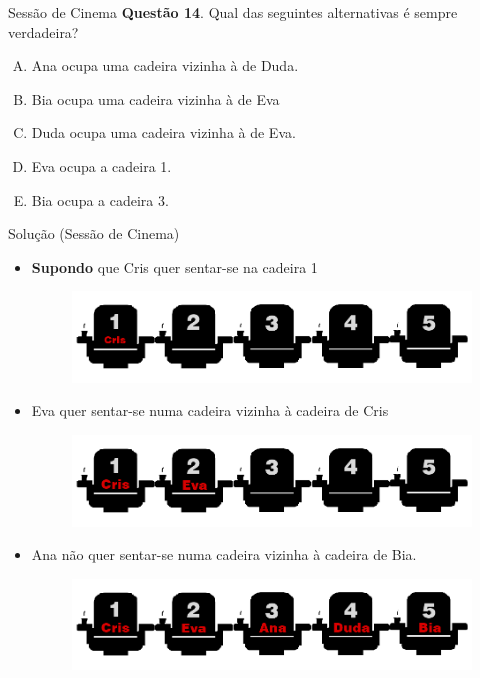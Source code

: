 \documentclass{beamer}
\begin{document}

\begin{frame}{Sessão de Cinema}
\textbf{Questão 14}. Qual das seguintes alternativas é
sempre verdadeira?
\begin{enumerate}[(A)]
    \item Ana ocupa uma cadeira vizinha à de Duda.
    \item Bia ocupa uma cadeira vizinha à de Eva
    \item Duda ocupa uma cadeira vizinha à de Eva.
    \item Eva ocupa a cadeira 1.
    \item Bia ocupa a cadeira 3.
\end{enumerate}
\end{frame}

\begin{frame}{Solução (Sessão de Cinema)}
\begin{itemize}
    \item \textbf{Supondo} que Cris quer sentar-se na cadeira 1
        \begin{figure}[ht]
        \centering
        \includegraphics[width=.8\textwidth]{nomes1.png}
        \label{fig:exampleFig2}
        \end{figure}
        \pause
        
    \item Eva quer sentar-se numa cadeira vizinha à cadeira de Cris
       \pause
       
       \begin{figure}[ht]
        \centering
        \includegraphics[width=.8\textwidth]{nomes2.png}
        \label{fig:exampleFig2}
        \end{figure}
    \item Ana não quer sentar-se numa cadeira vizinha à cadeira de Bia. \begin{figure}[ht]
        \centering
        \includegraphics[width=.8\textwidth]{nomes 3.png}
        \label{fig:exampleFig2}
        \end{figure}

\end{itemize}
\end{frame}
\end{document}
